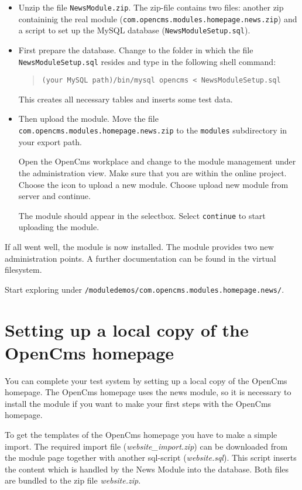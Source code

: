 \begin{itemize}
\item Unzip the file \texttt{NewsModule.zip}.
The zip-file contains two files: another zip containinig the real
module (\texttt{com.opencms.modules.homepage.news.zip}) and a
script to set up the MySQL database
(\texttt{NewsModuleSetup.sql}).

\item
First prepare the database.
Change to the folder in which the file \\
\texttt{NewsModuleSetup.sql} resides and type in the following
shell command:

\begin{quote}
\texttt{(your MySQL path)/bin/mysql opencms < NewsModuleSetup.sql}
\end{quote}

This creates all necessary tables and inserts some test data.

\item Then upload the module.
Move the file \\
\texttt{com.opencms.modules.homepage.news.zip} to the
\texttt{modules} subdirectory in your export path.

Open the OpenCms workplace and change to the module management
under the administration view. Make sure that you are within the
online project. Choose the icon to upload a new module. Choose
upload new module from server and continue.

The module should appear in the selectbox. Select
\texttt{continue} to start uploading the module.
\end{itemize}

If all went well, the module is now installed. The module provides
two new administration points. A further documentation can be
found in the virtual filesystem.

Start exploring under
\texttt{/moduledemos/com.opencms.modules.homepage.news/}.


\section{Setting up a local copy of the OpenCms homepage}
You can complete your test system by setting up a local copy of
the OpenCms homepage. The OpenCms homepage uses the news module,
so it is necessary to install the module if you want to make your
first steps with the OpenCms homepage.

To get the templates of the OpenCms homepage you have to make a
simple import. The required import file
(\textit{website\_import.zip}) can be downloaded from the module
page together with another sql-script (\textit{website.sql}). This
script inserts the content which is handled by the News Module
into the database. Both files are bundled to the zip file
\textit{website.zip}.


